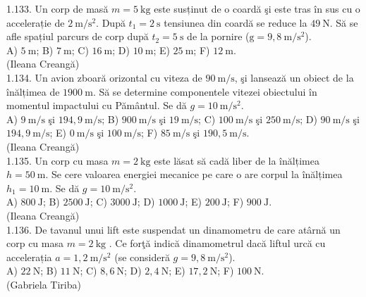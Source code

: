 1.133. Un corp de masă $m=5 \mathrm{~kg}$ este susținut de o coardă şi este tras în sus cu o accelerație de $2 \mathrm{~m} / \mathrm{s}^{2}$. După $t_{1}=2 \mathrm{~s}$ tensiunea din coardă se reduce la $49 \mathrm{~N}$. Să se afle spațiul parcurs de corp după $t_{2}=5 \mathrm{~s}$ de la pornire ($\mathrm{g}=9,8 \mathrm{~m} / \mathrm{s}^{2}$).\\ A) $5 \mathrm{~m}$; B) $7 \mathrm{~m}$; C) $16 \mathrm{~m}$; D) $10 \mathrm{~m}$; E) $25 \mathrm{~m}$; F) $12 \mathrm{~m}$.\\ (Ileana Creangă)\\

1.134. Un avion zboară orizontal cu viteza de $90 \mathrm{~m} / \mathrm{s}$, şi lansează un obiect de la înălțimea de $1900 \mathrm{~m}$. Să se determine componentele vitezei obiectului în momentul impactului cu Pământul. Se dă $g=10 \mathrm{~m} / \mathrm{s}^{2}$.\\ A) $9 \mathrm{~m} / \mathrm{s}$ şi $194,9 \mathrm{~m} / \mathrm{s}$; B) $900 \mathrm{~m} / \mathrm{s}$ şi $19 \mathrm{~m} / \mathrm{s}$; C) $100 \mathrm{~m} / \mathrm{s}$ şi $250 \mathrm{~m} / \mathrm{s}$; D) $90 \mathrm{~m} / \mathrm{s}$ şi $194,9 \mathrm{~m} / \mathrm{s}$; E) $0 \mathrm{~m} / \mathrm{s}$ şi $100 \mathrm{~m} / \mathrm{s}$; F) $85 \mathrm{~m} / \mathrm{s}$ şi $190,5 \mathrm{~m} / \mathrm{s}$.\\ (Ileana Creangă)\\

1.135. Un corp cu masa $m=2 \mathrm{~kg}$ este lăsat să cadă liber de la înălțimea $h=50 \mathrm{~m}$. Se cere valoarea energiei mecanice pe care o are corpul la înălțimea $h_{1}=10 \mathrm{~m}$. Se dă $g=10 \mathrm{~m} / \mathrm{s}^{2}$.\\ A) $800 \mathrm{~J}$; B) $2500 \mathrm{~J}$; C) $3000 \mathrm{~J}$; D) $1000 \mathrm{~J}$; E) $200 \mathrm{~J}$; F) $900 \mathrm{~J}$.\\ (Ileana Creangă)\\

1.136. De tavanul unui lift este suspendat un dinamometru de care atârnă un corp cu masa $m=2 \mathrm{~kg}$ . Ce forţă indică dinamometrul dacă liftul urcă cu accelerația $a=1,2 \mathrm{~m} / \mathrm{s}^{2}$ (se consideră $g=9,8 \mathrm{~m} / \mathrm{s}^{2}$).\\ A) $22 \mathrm{~N}$; B) $11 \mathrm{~N}$; C) $8,6 \mathrm{~N}$; D) $2,4 \mathrm{~N}$; E) $17,2 \mathrm{~N}$; F) $100 \mathrm{~N}$. \\ (Gabriela Tiriba)\\

